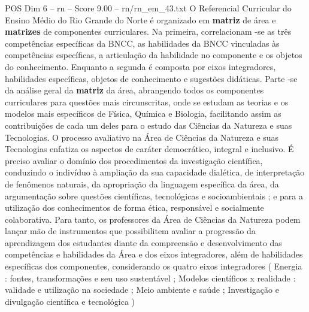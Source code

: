 \begin{textsample}{POS Dim 6 – rn – Score 9.00 – rn/rn\_em\_43.txt}
O Referencial Curricular do Ensino Médio do Rio Grande do Norte é organizado em \textbf{matriz} de área e \textbf{matrizes} de componentes curriculares.
Na primeira, correlacionam -se as três competências específicas da BNCC, as habilidades da BNCC vinculadas às competências específicas, a articulação da habilidade no componente e os objetos do conhecimento.
Enquanto a segunda é composta por eixos integradores, habilidades específicas, objetos de conhecimento e sugestões didáticas.
Parte -se da análise geral da \textbf{matriz} da área, abrangendo todos os componentes curriculares para questões mais circunscritas, onde se estudam as teorias e os modelos mais específicos de Física, Química e Biologia, facilitando assim as contribuições de cada um deles para o estudo das Ciências da Natureza e suas Tecnologias.
O processo avaliativo na Área de Ciências da Natureza e suas Tecnologias enfatiza os aspectos de caráter democrático, integral e inclusivo.
É preciso avaliar o domínio dos procedimentos da investigação científica, conduzindo o indivíduo à ampliação da sua capacidade dialética, de interpretação de fenômenos naturais, da apropriação da linguagem específica da área, da argumentação sobre questões científicas, tecnológicas e socioambientais ; e para a utilização dos conhecimentos de forma ética, responsável e socialmente colaborativa.
Para tanto, os professores da Área de Ciências da Natureza podem lançar mão de instrumentos que possibilitem avaliar a progressão da aprendizagem dos estudantes diante da compreensão e desenvolvimento das competências e habilidades da Área e dos eixos integradores, além de habilidades específicas dos componentes, considerando os quatro eixos integradores ( Energia : fontes, transformações e seu uso sustentável ; Modelos científicos x realidade : validade e utilização na sociedade ; Meio ambiente e saúde ; Investigação e divulgação científica e tecnológica )

\end{textsample}
